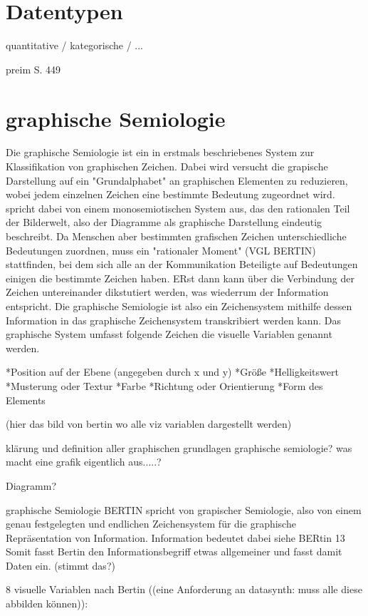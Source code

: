 \documentclass[a4paper, 12pt, DIVcalc, onepage, pdftex, headsepline, footsepline]{scrreprt}
\begin{document}
\section{Datentypen}
\label{sec:Datentypen}
quantitative / kategorische / ...

preim S. 449

\section{graphische Semiologie}
\label{sec:graphischeSemiologie}
Die graphische Semiologie ist ein in \cite{Bertin} erstmals beschriebenes System zur Klassifikation von graphischen Zeichen.
Dabei wird versucht die grapische Darstellung auf ein "Grundalphabet" an graphischen Elementen zu reduzieren, wobei
jedem einzelnen Zeichen eine bestimmte Bedeutung zugeordnet wird. \citep{Bertin} spricht dabei von einem
monosemiotischen System aus, das den rationalen Teil der Bilderwelt, also der Diagramme
als graphische Darstellung eindeutig beschreibt.
Da Menschen aber bestimmten grafischen Zeichen unterschiedliche Bedeutungen zuordnen, muss ein "rationaler Moment" (VGL BERTIN)
stattfinden, bei dem sich alle an der Kommunikation Beteiligte auf Bedeutungen einigen die bestimmte Zeichen
haben. ERst dann kann über die Verbindung der Zeichen untereinander dikstutiert werden, was wiederrum der
Information entspricht.
Die graphische Semiologie ist also ein Zeichensystem mithilfe dessen Information in das graphische Zeichensystem
transkribiert werden kann.
Das graphische System umfasst folgende Zeichen die visuelle Variablen genannt werden.

*Position auf der Ebene (angegeben durch x und y)
*Größe
*Helligkeitswert
*Musterung oder Textur
*Farbe
*Richtung oder Orientierung
*Form des Elements

(hier das bild von bertin wo alle viz variablen dargestellt werden)

klärung und definition aller graphischen grundlagen
graphische semiologie?
was macht eine grafik eigentlich aus.....?

Diagramm?

graphische Semiologie
BERTIN spricht von grapischer Semiologie, also von einem genau festgelegten und endlichen Zeichensystem für die graphische Repräsentation von Information.
Information bedeutet dabei siehe BERtin 13 Somit fasst Bertin den Informationsbegriff etwas allgemeiner und fasst damit Daten ein. (stimmt das?)

8 visuelle Variablen nach Bertin ((eine Anforderung an datasynth: muss alle diese abbilden können)):
\end{document}
